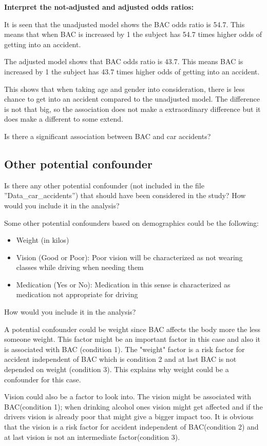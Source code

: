 \textbf{Interpret the not‐adjusted and adjusted odds ratios:}

It is seen that the unadjusted model shows the BAC odds ratio is 54.7. This means that when BAC is increased by 1 the subject has 54.7 times higher odds of getting into an accident. 

The adjusted model shows that BAC odds ratio is 43.7. This means BAC is increased by 1 the subject has 43.7 times higher odds of getting into an accident. 

This shows that when taking age and gender into consideration, there is less chance to get into an accident compared to the unadjusted model. The difference is not that big, so the association does not make a extraordinary difference but it does make a different to some extend.

Is there a significant association between BAC and car accidents? 

\subsection{Other potential confounder}
Is there any other potential confounder (not included in the file ”Data\_car\_accidents”) that should have
been considered in the study? 
How would you include it in the analysis?

Some other potential confounders based on demographics could be the following:
\begin{itemize}
    \item Weight (in kilos)
    \item Vision (Good or Poor): Poor vision will be characterized as not wearing classes while driving when needing them
    \item Medication (Yes or No): Medication in this sense is characterized as medication not appropriate for driving
    
\end{itemize}
How would you include it in the analysis?

A potential confounder could be weight since BAC affects the body more the less someone weight. This factor might be an important factor in this case and also it is associated with BAC (condition 1). The "weight" factor is a risk factor for accident independent of BAC which is condition 2 and at last BAC is not depended on weight (condition 3). This explains why weight could be a confounder for this case.

Vision could also be a factor to look into. The vision might be associated with BAC(condition 1); when drinking alcohol ones vision might get affected and if the drivers vision is already poor that might give a bigger impact too. It is obvious that the vision is a risk factor for accident independent of BAC(condition 2) and at last vision is not an intermediate factor(condition 3). 


